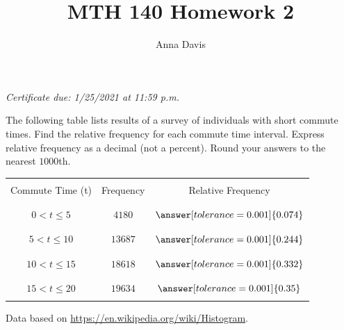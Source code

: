 \documentclass{ximera}
\author{Anna Davis} \title{MTH 140 Homework 2}
\begin{document}
\begin{abstract}

\end{abstract}
\maketitle
 \textit{Certificate due: 1/25/2021 at 11:59 p.m.}
\begin{problem}\label{prob:140hom2prob1}
The following table lists results of a survey of individuals with short commute times.
Find the relative frequency for each commute time interval.  Express relative frequency as a decimal (not a percent).  Round your answers to the nearest $1000$th.
\begin{center}
\begin{tabular}{|c|c|c|}
 \hline
 &&   \\
 Commute Time (t)&Frequency& Relative Frequency \\
 &&   \\
  \hline
  &&  \\
 $0<t\leq 5$&$4180$&$\answer[tolerance=0.001]{0.074}$ \\
  && \\
 \hline
  && \\
 $5<t\leq 10$&$13687$&$\answer[tolerance=0.001]{0.244}$ \\
  && \\
 \hline
  && \\
  $10<t\leq 15$&$18618$&$\answer[tolerance=0.001]{0.332}$  \\
  && \\
 \hline
 && \\
  $15<t\leq 20$&$19634$&$\answer[tolerance=0.001]{0.35}$  \\
  && \\
 \hline
 \end{tabular}
\end{center}    
Data based on \href{https://en.wikipedia.org/wiki/Histogram}{https://en.wikipedia.org/wiki/Histogram}.
\end{problem}
\end{document}
